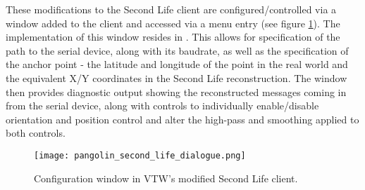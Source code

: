 These modifications to the Second Life client are configured/controlled via a window added to the client and accessed via a menu entry (see figure \ref{pangolin_second_life_dialogue.png}). The implementation of this window resides in . This allows for specification of the path to the serial device, along with its baudrate, as well as the specification of the anchor point - the latitude and longitude of the point in the real world and the equivalent X/Y coordinates in the Second Life reconstruction. The window then provides diagnostic output showing the reconstructed messages coming in from the serial device, along with controls to individually enable/disable orientation and position control and alter the high-pass and smoothing applied to both controls.

\begin{figure}[h]
\centering
  \texttt{[image: pangolin\_second\_life\_dialogue.png]}
  \caption{Configuration window in VTW's modified Second Life client.}
  \label{pangolin_second_life_dialogue.png}
\end{figure}

